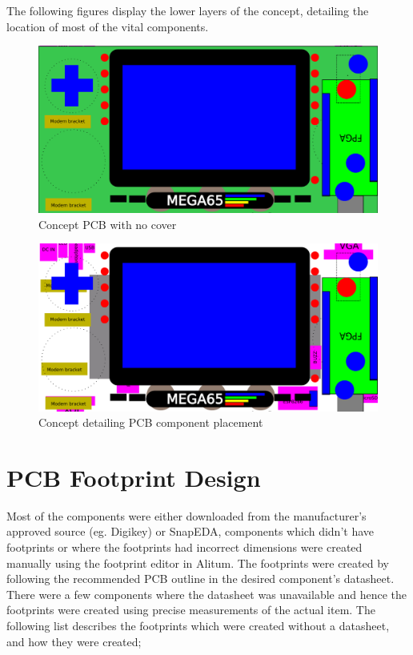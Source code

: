	The following figures display the lower layers of the concept, detailing the location of most of the vital components. 

\begin{figure}
	\includegraphics[width=\linewidth]{Figures/handset-layout-v1-no-Cover.pdf}
	\caption{Concept PCB with no cover}
	\label{fig:nocover}
\end{figure}

\begin{figure}
	\includegraphics[width=\linewidth]{Figures/handset-layout-v1-no-PCB-no-Cover.pdf}
	\caption{Concept detailing PCB component placement }
	\label{fig:nopcb}
\end{figure}


\section{PCB Footprint Design}
\label{chap6sec4}

	Most of the components were either downloaded from the manufacturer's approved source (eg. Digikey) or SnapEDA, components which didn't have footprints or where the footprints had incorrect dimensions were created manually using the footprint editor in Alitum. 
The footprints were created by following the recommended PCB outline in the desired component's datasheet. 
There were a few components where the datasheet was unavailable and hence the footprints were created using precise measurements of the actual item. 
The following list describes the footprints which were created without a datasheet, and how they were created;

